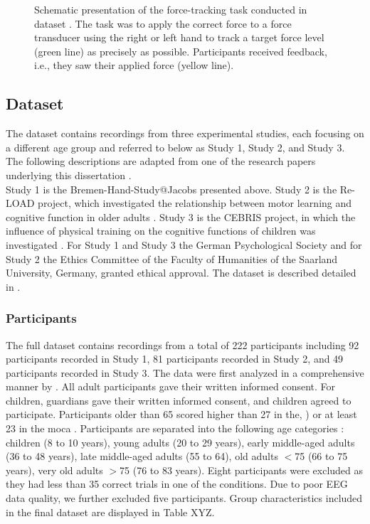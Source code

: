 \begin{figure}[h]
\begin{center}

\caption[Schematic presentation of the force-tracking task conducted in dataset .]{Schematic presentation of the force-tracking task conducted in dataset . The task was to apply the correct force to a force transducer using the right or left hand to track a target force level (green line) as precisely as possible. Participants received feedback, i.e., they saw their applied force (yellow line).}
\label{fig:DSI_exp1}
\end{center}
\end{figure}

\subsection{Dataset }
\label{methods:datasets:II}
The  dataset contains recordings from three experimental studies, each focusing on a different age group and referred to below as Study 1, Study 2, and Study 3. The following descriptions are adapted from one of the research papers underlying this dissertation \cite{Goelz2023}.\\
Study 1 is the Bremen-Hand-Study@Jacobs presented above. Study 2 is the Re-LOAD project, which investigated the relationship between motor learning and cognitive function in older adults \cite{HUBNER2018104, Hübner2018}. Study 3 is the CEBRIS project, in which the influence of physical training on the cognitive functions of children was investigated \cite{Koutsandreou2016}. For Study 1 and Study 3 the German Psychological Society and for Study 2 the Ethics Committee of the Faculty of Humanities of the Saarland University, Germany, granted ethical approval. The dataset is described detailed in \cite{Reuter2019}. 

\subsubsection{Participants}
\label{methods:datasets:II:participants}
The full dataset contains recordings from a total of 222 participants including 92 participants recorded in Study 1, 81 participants recorded in Study 2, and 49 participants recorded in Study 3. The data were first analyzed in a comprehensive manner by \citeauthor{Reuter2019} \cite{Reuter2019}. All adult participants gave their written informed consent. For children, guardians gave their written informed consent, and children agreed to participate.  Participants older than 65 scored higher than 27 in the, \cite{Folstein1975}) or at least 23 in the \gls{moca} \cite{Julayanont2017, Nasreddine2005}. Participants are separated into the following age categories \cite{Reuter2019}: children (8 to 10 years), young adults (20 to 29 years), early middle-aged adults (36 to 48 years), late middle-aged adults (55 to 64), old adults $<$75 (66 to 75 years), very old adults $>$75 (76 to 83 years). Eight participants were excluded as they had less than 35 correct trials in one of the conditions. Due to poor EEG data quality, we further excluded five participants. Group characteristics included in the final dataset are displayed in Table XYZ.

